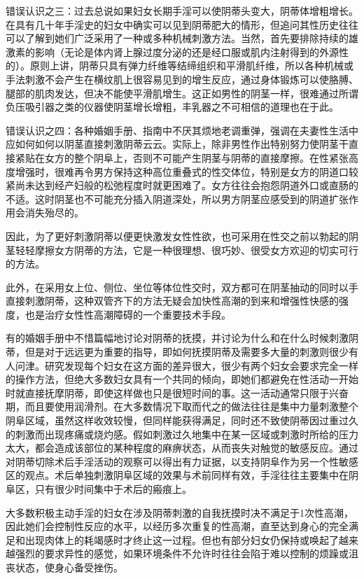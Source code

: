 \begin{enumerate}
错误认识之三：过去总说如果妇女长期手淫可以使阴蒂头变大，阴蒂体增粗增长。在具有几十年手淫史的妇女中确实可以见到阴蒂肥大的情形，但追问其性历史往往可以了解到她们广泛采用了一种或多种机械刺激方法。当然，首先要排除持续的雄激素的影响（无论是体内肾上腺过度分泌的还是经口服或肌内注射得到的外源性的）。原则上讲，阴蒂只具有弹力纤维等结缔组织和平滑肌纤维，所以各种机械或手法刺激不会产生在横纹肌上很容易见到的增生反应，通过身体锻炼可以使胳膊、腿部的肌肉发达，但决不能使平滑肌增生。这正如男性的阴茎一样，很难通过所谓负压吸引器之类的仪器使阴茎增长增粗，丰乳器之不可相信的道理也在于此。

错误认识之四：各种婚姻手册、指南中不厌其烦地老调重弹，强调在夫妻性生活中应如何如何以阴茎直接刺激阴蒂云云。实际上，除非男性作出特别努力使阴茎干直接紧贴在女方的整个阴阜上，否则不可能产生阴茎与阴蒂的直接摩擦。在性紧张高度增强时，很难再令男方保持这种高位重叠式的性交体位，特别是女方的阴道口较紧尚未达到经产妇般的松弛程度时就更困难了。女方往往会抱怨阴道外口或直肠的不适。这时阴茎也不可能充分插入阴道深处，所以男方阴茎应感受到的阴道扩张作用会消失殆尽的。

因此，为了更好刺激阴蒂以便更快激发女性性欲，也可采用在性交之前以勃起的阴茎轻轻摩擦女方阴蒂的方法，它是一种很理想、很巧妙、很受女方欢迎的切实可行的方法。

此外，在采用女上位、侧位、坐位等体位性交时，双方都可在阴茎抽动的同时以手直接刺激阴蒂，这种双管齐下的方法无疑会加快性高潮的到来和增强性快感的强度，也是治疗女性性高潮障碍的一个重要技术手段。

有的婚姻手册中不惜篇幅地讨论对阴蒂的抚摸，并讨论为什么和在什么时候刺激阴蒂，但是对于远远更为重要的指导，即如何抚摸阴蒂及需要多大量的刺激则很少有人问津。研究发现每个妇女在这方面的差异很大，很少有两个妇女会要求完全一样的操作方法，但绝大多数妇女具有一个共同的倾向，即她们都避免在性活动一开始时就直接抚摩阴蒂，即使这样做也只是很短时间的事。这一活动通常只限于兴奋期，而且要使用润滑剂。在大多数情况下取而代之的做法往往是集中力量刺激整个阴阜区域，虽然这样收效较慢，但同样能获得满足，同时还不致使阴蒂因过重过久的刺激而出现疼痛或烧灼感。假如刺激过久地集中在某一区域或刺激时所给的压力太大，都会造成该部位的某种程度的麻痹状态，从而丧失对触觉的敏感反应。通过对阴蒂切除术后手淫活动的观察可以得出有力证据，以支持阴阜作为另一个性敏感区的观点。术后单独刺激阴阜区域的效果与术前同样有效，手淫往往主要集中在阴阜区，只有很少时间集中于术后的瘢痕上。

大多数积极主动手淫的妇女在涉及阴蒂刺激的自我抚摸时决不满足于1次性高潮，因此她们会控制性反应的水平，以经历多次重复的性高潮，直至达到身心的完全满足和出现肉体上的耗竭感时才终止这一过程。但也有部分妇女仍保持或唤起了越来越强烈的要求异性的感觉，如果环境条件不允许时往往会陷于难以控制的烦躁或沮丧状态，使身心备受挫伤。


\end{enumerate}
